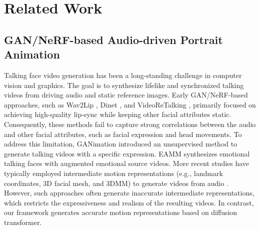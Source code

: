 \section{Related Work}
\subsection{GAN/NeRF-based Audio-driven Portrait Animation}
Talking face video generation has been a long-standing challenge in computer vision and graphics. The goal is to synthesize lifelike and synchronized talking videos from driving audio and static reference images. Early GAN/NeRF-based approaches, such as Wav2Lip \cite{prajwal2020lip}, Dinet \cite{zhang2023dinet}, and VideoReTalking \cite{cheng2022videoretalking}, primarily focused on achieving high-quality lip-sync while keeping other facial attributes static. Consequently, these methods fail to capture strong correlations between the audio and other facial attributes, such as facial expression and head movements. To address this limitation, GANimation \cite{pumarola2018ganimation} introduced an unsupervised method to generate talking videos with a specific expression. EAMM \cite{ji2022eamm} synthesizes emotional talking faces with augmented emotional source videos. More recent studies have typically employed intermediate motion representations (e.g., landmark coordinates, 3D facial mesh, and 3DMM) to generate videos from audio \cite{zhang2023sadtalker,gan2023efficient,peng2024synctalk}. However, such approaches often generate inaccurate intermediate representations, which restricts the expressiveness and realism of the resulting videos. In contrast, our framework generates accurate motion representations based on diffusion transformer. 

